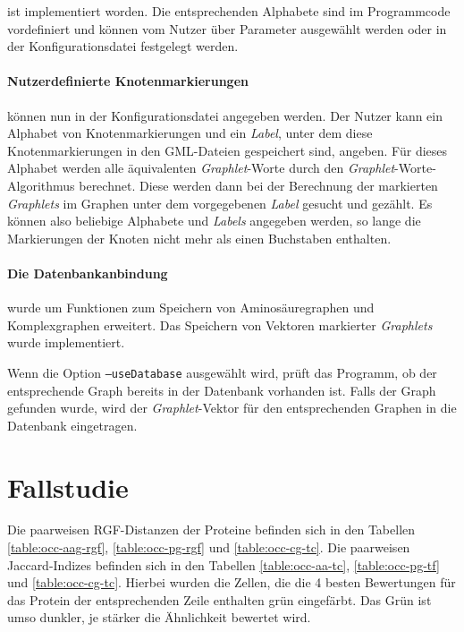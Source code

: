 \documentclass{report}
\begin{document}
ist implementiert worden. Die entsprechenden Alphabete sind im Programmcode vordefiniert und k\"onnen vom Nutzer \"uber Parameter ausgew\"ahlt werden oder in der Konfigurationsdatei festgelegt werden.

\paragraph{Nutzerdefinierte Knotenmarkierungen} k\"onnen nun in der Konfigurationsdatei angegeben werden. Der Nutzer kann ein Alphabet von Knotenmarkierungen und ein \textit{Label}, unter dem diese Knotenmarkierungen in den GML-Dateien gespeichert sind, angeben. F\"ur dieses Alphabet werden alle \"aquivalenten \textit{Graphlet}-Worte durch den \textit{Graphlet}-Worte-Algorithmus berechnet. Diese werden dann bei der Berechnung der markierten \textit{Graphlets} im Graphen unter dem vorgegebenen \textit{Label} gesucht und gez\"ahlt.
Es k\"onnen also beliebige Alphabete und \textit{Labels} angegeben werden, so lange die Markierungen der Knoten nicht mehr als einen Buchstaben enthalten.


 

\paragraph{Die Datenbankanbindung} wurde um Funktionen zum Speichern von Aminos\"auregraphen und Komplexgraphen erweitert. Das Speichern von Vektoren markierter \textit{Graphlets} wurde implementiert.

Wenn die Option \texttt{--useDatabase} ausgew\"ahlt wird, pr\"uft das Programm, ob der entsprechende Graph bereits in der Datenbank vorhanden ist. Falls der Graph gefunden wurde, wird der \textit{Graphlet}-Vektor f\"ur den entsprechenden Graphen in die Datenbank eingetragen. 



\section{Fallstudie}

Die paarweisen RGF-Distanzen der Proteine befinden sich in den Tabellen  \ref{table:occ-aag-rgf}, \ref{table:occ-pg-rgf} und \ref{table:occ-cg-tc}. Die paarweisen Jaccard-Indizes befinden sich in den Tabellen \ref{table:occ-aa-tc}, \ref{table:occ-pg-tf} und \ref{table:occ-cg-tc}.
Hierbei wurden die Zellen, die die 4 besten Bewertungen f\"ur das Protein der entsprechenden Zeile enthalten gr\"un eingef\"arbt. Das Gr\"un ist umso dunkler, je st\"arker die \"Ahnlichkeit bewertet wird.
\end{document}
